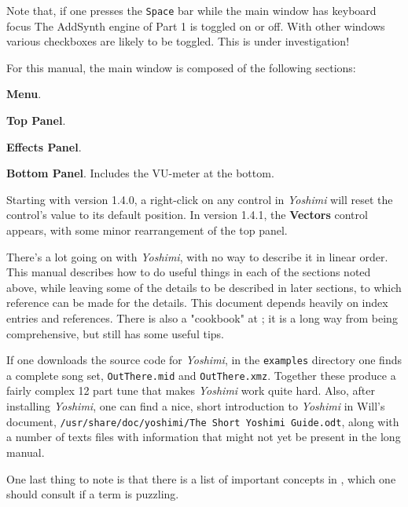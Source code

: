 \documentclass[
 11pt,
 twoside,
 a4paper,
 final                                 %
]{article}
\begin{document}
   Note that, if one presses the \texttt{Space} bar while the main window has
   keyboard focus The AddSynth engine of Part 1 is toggled on or off. With other windows various checkboxes are likely to be toggled. This is under investigation!

   For this manual, the main window is composed of the following sections:

\begin{enumber}
   \item \textbf{Menu}.
   \item \textbf{Top Panel}.
   \item \textbf{Effects Panel}.
   \item \textbf{Bottom Panel}.  Includes the VU-meter at the bottom.
\end{enumber}

   Starting with version 1.4.0, a right-click on any control in \textsl{Yoshimi}
   will reset the control's value to its default position.  In version 1.4.1, the \textbf{Vectors} control appears, with some minor rearrangement of the top panel.

   There's a lot going on with \textsl{Yoshimi}, with no way to describe
   it in linear order.  This manual describes how to do useful things in
   each of the sections noted above, while leaving some of the details to be
   described in later sections, to which reference can be made for the details.
   This document depends heavily on index entries and references.
   There is also a "cookbook" at \cite{book}; it is a long way from being
   comprehensive, but still has some useful tips.

   If one downloads the source code for \textsl{Yoshimi}, in the
   \texttt{examples} directory one finds a complete song set,
   \texttt{OutThere.mid} and \texttt{OutThere.xmz}. Together these produce a
   fairly complex 12 part tune that makes \textsl{Yoshimi} work quite hard.
   Also, after installing \textsl{Yoshimi}, one can find a nice, short
   introduction to \textsl{Yoshimi} in Will's document,
   \texttt{/usr/share/doc/yoshimi/The Short Yoshimi Guide.odt},
   along with a number of texts files with information that might not yet be
   present in the long manual.

   One last thing to note is that there is a list of important concepts in
   , which one should consult if a term is puzzling.

\rhead{\rightmark}         %
\end{document}
